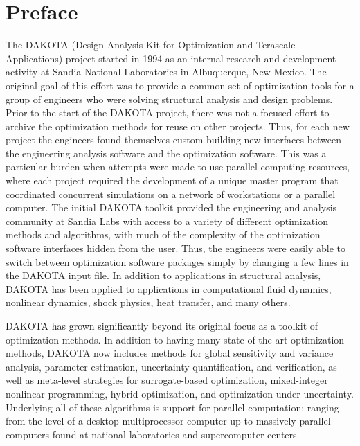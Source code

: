 \chapter*{Preface}

The DAKOTA (Design Analysis Kit for Optimization and Terascale
Applications) project started in 1994 as an internal research and
development activity at Sandia National Laboratories in Albuquerque,
New Mexico. The original goal of this effort was to provide a common
set of optimization tools for a group of engineers who were solving
structural analysis and design problems. Prior to the start of the
DAKOTA project, there was not a focused effort to archive the
optimization methods for reuse on other projects. Thus, for each new
project the engineers found themselves custom building new interfaces
between the engineering analysis software and the optimization
software. This was a particular burden when attempts were made to use
parallel computing resources, where each project required the
development of a unique master program that coordinated concurrent
simulations on a network of workstations or a parallel computer. The
initial DAKOTA toolkit provided the engineering and analysis community
at Sandia Labs with access to a variety of different optimization
methods and algorithms, with much of the complexity of the
optimization software interfaces hidden from the user. Thus, the
engineers were easily able to switch between optimization software
packages simply by changing a few lines in the DAKOTA input file. In
addition to applications in structural analysis, DAKOTA has been
applied to applications in computational fluid dynamics, nonlinear
dynamics, shock physics, heat transfer, and many others.

DAKOTA has grown significantly beyond its original focus as a toolkit
of optimization methods. In addition to having many state-of-the-art
optimization methods, DAKOTA now includes methods for global
sensitivity and variance analysis, parameter estimation, uncertainty
quantification, and verification, as well as meta-level strategies for
surrogate-based optimization, mixed-integer nonlinear programming,
hybrid optimization, and optimization under uncertainty. Underlying
all of these algorithms is support for parallel computation; ranging
from the level of a desktop multiprocessor computer up to massively
parallel computers found at national laboratories and supercomputer
centers.


